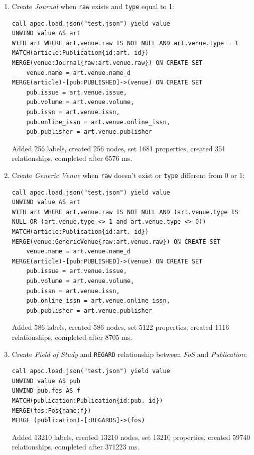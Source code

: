 \documentclass{Configuration_Files/PoliMi3i_thesis}
\begin{document}
\begin{enumerate}
    \item Create \emph{Journal} when \verb |raw| exists and \verb |type| equal to 1:
        \begin{lstlisting}[language=cypher, label=lst:cypher-example]
call apoc.load.json("test.json") yield value
UNWIND value AS art
WITH art WHERE art.venue.raw IS NOT NULL AND art.venue.type = 1
MATCH(article:Publication{id:art._id})
MERGE(venue:Journal{raw:art.venue.raw}) ON CREATE SET
    venue.name = art.venue.name_d
MERGE(article)-[pub:PUBLISHED]->(venue) ON CREATE SET
    pub.issue = art.venue.issue,
    pub.volume = art.venue.volume,
    pub.issn = art.venue.issn,
    pub.online_issn = art.venue.online_issn,
    pub.publisher = art.venue.publisher
        \end{lstlisting}
        Added 256 labels, created 256 nodes, set 1681 properties, created 351 relationships, completed after 6576 ms.
    \item Create \emph{Generic Venue} when \verb |raw| doesn't exist or \verb |type| different from 0 or 1:
        \begin{lstlisting}[language=cypher, label=lst:cypher-example]
call apoc.load.json("test.json") yield value
UNWIND value AS art
WITH art WHERE art.venue.raw IS NOT NULL AND (art.venue.type IS NULL OR (art.venue.type <> 1 and art.venue.type <> 0))
MATCH(article:Publication{id:art._id})
MERGE(venue:GenericVenue{raw:art.venue.raw}) ON CREATE SET
    venue.name = art.venue.name_d
MERGE(article)-[pub:PUBLISHED]->(venue) ON CREATE SET
    pub.issue = art.venue.issue,
    pub.volume = art.venue.volume,
    pub.issn = art.venue.issn,
    pub.online_issn = art.venue.online_issn,
    pub.publisher = art.venue.publisher
        \end{lstlisting}
        Added 586 labels, created 586 nodes, set 5122 properties, created 1116 relationships, completed after 8705 ms.
    \item Create \emph{Field of Study} and \verb |REGARD| relationship between \emph{FoS} and \emph{Publication}:
        \begin{lstlisting}[language=cypher, label=lst:cypher-example]
call apoc.load.json("test.json") yield value
UNWIND value AS pub
UNWIND pub.fos AS f
MATCH(publication:Publication{id:pub._id})
MERGE(fos:Fos{name:f})
MERGE (publication)-[:REGARDS]->(fos)
        \end{lstlisting}
        Added 13210 labels, created 13210 nodes, set 13210 properties, created 59740 relationships, completed after 371223 ms.
\end{enumerate}
\end{document}
